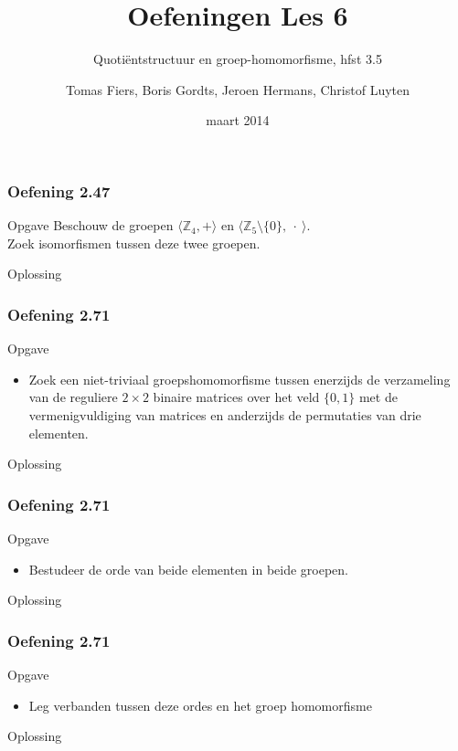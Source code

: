 \documentclass[10pt]{beamer}
\title{Oefeningen Les 6}
\subtitle{Quoti\"{e}ntstructuur en groep-homomorfisme, hfst 3.5}
\author{{\scriptsize Tomas Fiers, Boris Gordts, Jeroen Hermans, Christof Luyten}}
\date{maart 2014}
\institute{{\normalsize Toegepaste Discrete Algebra}}
\begin{document}
\begin{frame}
	\titlepage
\end{frame}

\begin{frame}
	\frametitle{Oefening 2.47}
	\begin{block}{Opgave}
		Beschouw de groepen $\langle \mathbb{Z}_{4}, + \rangle$
		en $\langle \mathbb{Z}_{5}\setminus\lbrace0\rbrace,\:\cdot\: \rangle$.\\
		Zoek isomorfismen tussen deze twee groepen.
	\end{block}
	\begin{block}{Oplossing}
		
	\end{block}
\end{frame}

\begin{frame}
	\frametitle{Oefening 2.71}
	\begin{block}{Opgave}
	\begin{itemize}
		\item Zoek een niet-triviaal groepshomomorfisme tussen 
		enerzijds de verzameling van de reguliere $2\times2$ binaire matrices 
		over het veld $\lbrace0,1\rbrace$
		met de vermenigvuldiging van matrices en anderzijds 
		de permutaties van drie elementen.
	\end{itemize}
	\end{block}
	\begin{block}{Oplossing}
		
	\end{block}
\end{frame}
\begin{frame}
	\frametitle{Oefening 2.71}
	\begin{block}{Opgave}
	\begin{itemize}
		\item Bestudeer de orde van beide elementen in beide groepen.
	\end{itemize}
	\end{block}
	\begin{block}{Oplossing}
		
	\end{block}
\end{frame}
\begin{frame}
	\frametitle{Oefening 2.71}
	\begin{block}{Opgave}
	\begin{itemize}
		\item Leg verbanden tussen deze ordes en het groep homomorfisme
	\end{itemize}
	\end{block}
	\begin{block}{Oplossing}
		
	\end{block}
\end{frame}
\end{document}
